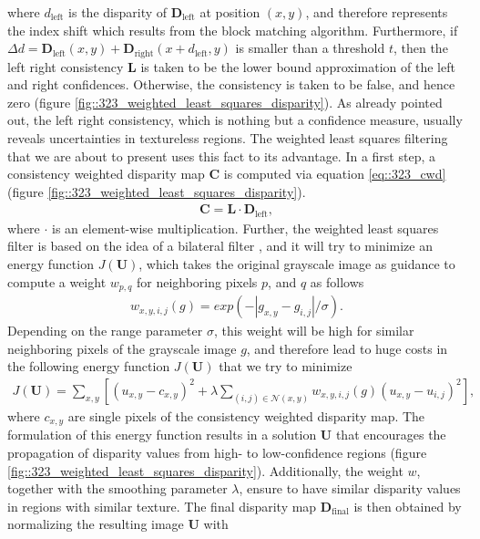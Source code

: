 where $d_\text{left}$ is the disparity of $\bm{D}_\text{left}$ at position $(x,y)$, and therefore represents the index shift which results from the block matching algorithm. Furthermore, if $\Delta d = \bm{D}_\text{left}(x, y) + \bm{D}_\text{right}(x + d_\text{left}, y)$ is smaller than a threshold $t$, then the left right consistency $\bm{L}$ is taken to be the lower bound approximation of the left and right confidences. Otherwise, the consistency is taken to be false, and hence zero (figure \ref{fig::323_weighted_least_squares_disparity}). As already pointed out, the left right consistency, which is nothing but a confidence measure, usually reveals uncertainties in textureless regions. The weighted least squares filtering that we are about to present uses this fact to its advantage. In a first step, a consistency weighted disparity map $\bm{C}$ is computed via equation \ref{eq::323_cwd} (figure \ref{fig::323_weighted_least_squares_disparity}).
\begin{align}
	\bm{C}=\bm{L}\cdot\bm{D}_\text{left},
	\label{eq::323_cwd}
\end{align}
where $\cdot$ is an element-wise multiplication. Further, the weighted least squares filter is based on the idea of a bilateral filter \cite{tomasi1998bilateral}, and it will try to minimize an energy function $J(\bm{U})$, which takes the original grayscale image as guidance to compute a weight $w_{p,q}$ for neighboring pixels $p$, and $q$ as follows
\begin{align}
	w_{x,y,i,j}(g) = exp(-|g_{x,y}-g_{i,j}|/\sigma).
	\label{eq::323_weight}
\end{align}
Depending on the range parameter $\sigma$, this weight will be high for similar neighboring pixels of the grayscale image $g$, and therefore lead to huge costs in the following energy function $J(\bm{U})$ that we try to minimize
\begin{align}
	J(\bm{U}) = \sum_{x,y}\left[(u_{x,y}-c_{x,y})^2+\lambda\sum_{(i,j)\in\mathcal{N}(x,y)}w_{x,y,i,j}(g)(u_{x,y}-u_{i,j})^2\right],
\end{align}
where $c_{x,y}$ are single pixels of the consistency weighted disparity map. The formulation of this energy function results in a solution $\bm{U}$ that encourages the propagation of disparity values from high- to low-confidence regions (figure \ref{fig::323_weighted_least_squares_disparity}). Additionally, the weight $w$, together with the smoothing parameter $\lambda$, ensure to have similar disparity values in regions with similar texture. The final disparity map $\bm{D}_\text{final}$ is then obtained by normalizing the resulting image $\bm{U}$ with

